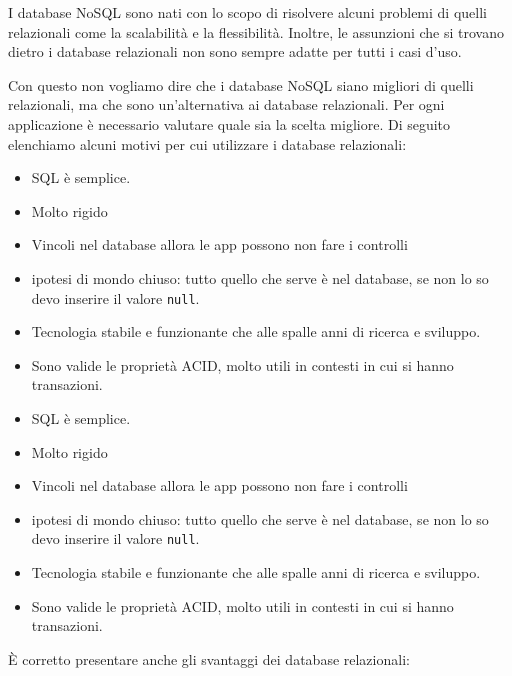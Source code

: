 I database NoSQL sono nati con lo scopo di risolvere alcuni problemi di quelli
relazionali come la scalabilità e la flessibilità. Inoltre, le assunzioni che
si trovano dietro i database relazionali non sono sempre adatte per tutti i
casi d'uso.

Con questo non vogliamo dire che i database NoSQL siano migliori di quelli
relazionali, ma che sono un'alternativa ai database relazionali. Per ogni
applicazione è necessario valutare quale sia la scelta migliore. Di seguito
elenchiamo alcuni motivi per cui utilizzare i database relazionali:
\begin{itemize}
      \item SQL è semplice.
      \item Molto rigido
      \item Vincoli nel database allora le app possono non fare i controlli
      \item ipotesi di mondo chiuso: tutto quello che serve è nel database, se non
            lo so devo inserire il valore \texttt{null}.
      \item Tecnologia stabile e funzionante che alle spalle anni di ricerca e
            sviluppo.
      \item Sono valide le proprietà ACID, molto utili in contesti in cui si
            hanno transazioni.
      \item SQL è semplice.
      \item Molto rigido
      \item Vincoli nel database allora le app possono non fare i controlli
      \item ipotesi di mondo chiuso: tutto quello che serve è nel database, se non
            lo so devo inserire il valore \texttt{null}.
      \item Tecnologia stabile e funzionante che alle spalle anni di ricerca e
            sviluppo.
      \item Sono valide le proprietà ACID, molto utili in contesti in cui si
            hanno transazioni.
\end{itemize}
È corretto presentare anche gli svantaggi dei database relazionali:
